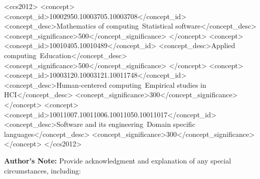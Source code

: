 \documentclass[acmsmall]{acmart}
\begin{document}
\begin{CCSXML}
<ccs2012>
<concept>
<concept_id>10002950.10003705.10003708</concept_id>
<concept_desc>Mathematics of computing~Statistical software</concept_desc>
<concept_significance>500</concept_significance>
</concept>
<concept>
<concept_id>10010405.10010489</concept_id>
<concept_desc>Applied computing~Education</concept_desc>
<concept_significance>500</concept_significance>
</concept>
<concept>
<concept_id>10003120.10003121.10011748</concept_id>
<concept_desc>Human-centered computing~Empirical studies in HCI</concept_desc>
<concept_significance>300</concept_significance>
</concept>
<concept>
<concept_id>10011007.10011006.10011050.10011017</concept_id>
<concept_desc>Software and its engineering~Domain specific languages</concept_desc>
<concept_significance>300</concept_significance>
</concept>
</ccs2012>
\end{CCSXML}



%


%
\maketitle

\vspace{3mm}
\textbf{Author's Note:} Provide acknowledgment and explanation of any special circumstances, including:
\end{document}
